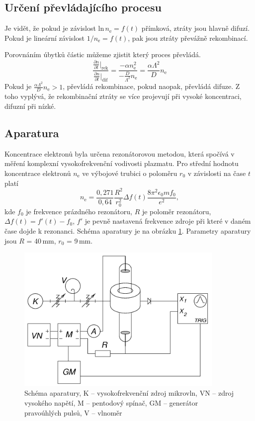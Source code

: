 \documentclass[12pt]{article}
\begin{document}
\subsection{Určení převládajícího procesu}
Je vidět, že pokud je závislost $\mathrm{ln}\,n_\mathrm{e} = f(t)$ přímková, ztráty jsou hlavně difuzí. Pokud je lineární závislost $1/n_\mathrm{e} = f(t)$, pak jsou ztráty převážně rekombinací.

Porovnáním úbytků částic můžeme zjistit který proces převládá.
\begin{equation}
\frac{\frac{\partial n}{\partial t}|_\mathrm{rek}}{\frac{\partial n}{\partial t}|_\mathrm{dif}} = \frac{-\alpha n_\mathrm{e}^2}{-\frac{D}{\Lambda^2}n_\mathrm{e}} = \frac{\alpha \Lambda^2}{ D} n_\mathrm{e}
\end{equation}
Pokud je $\frac{\alpha \Lambda^2}{ D} n_\mathrm{e} > 1$, převládá rekombinace, pokud naopak, převládá difuze. Z toho vyplývá, že rekombinační ztráty se více projevují při vysoké koncentraci, difuzní při nízké.

\subsection{Aparatura}
Koncentrace elektronů byla určena rezonátorovou metodou, která spočívá v měření komplexní vysokofrekvenční vodivosti plazmatu. 
Pro střední hodnotu koncentrace elektronů $n_\mathrm{e}$ ve výbojové trubici o poloměru $r_0$ v závislosti na čase $t$ platí
\begin{equation}
n_\mathrm{e} = \frac{0,271}{0,64} \frac{R^2}{r_0^2} \Delta f(t) \frac{8 \pi^2 \epsilon_0 m f_0}{e^2} \mathrm{,}
\end{equation}
kde $f_0$ je frekvence prázdného rezonátoru, $R$ je poloměr rezonátoru, $\Delta f(t) = f'(t) - f_0$, $f'$ je pevně nastavená frekvence zdroje při které v daném čase dojde k rezonanci. Schéma aparatury je na obrázku \ref{schema}. Parametry aparatury jsou $R$ = 40\,mm, $r_0$ = 9\,mm. 


\begin{figure}[htbp]
\begin{center}
\includegraphics[width=10cm]{schema.png}
\caption{Schéma aparatury, K -- vysokofrekvenční zdroj mikrovln, VN -- zdroj vysokého napětí, M -- pentodový spínač, GM -- generátor pravoúhlých pulsů, V -- vlnoměr}
\label{schema}
\end{center}
\end{figure}
\end{document}
